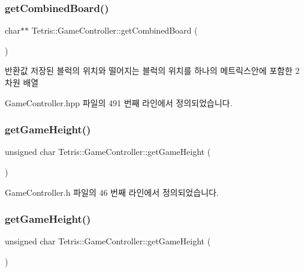 \subsubsection{\texorpdfstring{get\+Combined\+Board()}{getCombinedBoard()}}
{\footnotesize\ttfamily char$\ast$$\ast$ Tetris\+::\+Game\+Controller\+::get\+Combined\+Board (\begin{DoxyParamCaption}{ }\end{DoxyParamCaption})\hspace{0.3cm}{\ttfamily [inline]}}

\begin{DoxyReturn}{반환값}
저장된 블럭의 위치와 떨어지는 블럭의 위치를 하나의 메트릭스안에 포함한 2차원 배열 
\end{DoxyReturn}


Game\+Controller.\+hpp 파일의 491 번째 라인에서 정의되었습니다.

\mbox{\label{class_tetris_1_1_game_controller_a10163479e02572450b886ff0654078b4}} 
\subsubsection{\texorpdfstring{get\+Game\+Height()}{getGameHeight()}\hspace{0.1cm}{\footnotesize\ttfamily [1/2]}}
{\footnotesize\ttfamily unsigned char Tetris\+::\+Game\+Controller\+::get\+Game\+Height (\begin{DoxyParamCaption}{ }\end{DoxyParamCaption})\hspace{0.3cm}{\ttfamily [inline]}}



Game\+Controller.\+h 파일의 46 번째 라인에서 정의되었습니다.

\mbox{\label{class_tetris_1_1_game_controller_a10163479e02572450b886ff0654078b4}} 
\subsubsection{\texorpdfstring{get\+Game\+Height()}{getGameHeight()}\hspace{0.1cm}{\footnotesize\ttfamily [2/2]}}
{\footnotesize\ttfamily unsigned char Tetris\+::\+Game\+Controller\+::get\+Game\+Height (\begin{DoxyParamCaption}{ }\end{DoxyParamCaption})\hspace{0.3cm}{\ttfamily [inline]}}



